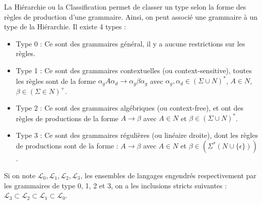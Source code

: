 La Hiérarchie ou la Classification permet de classer un type selon la forme des règles de production d'une grammaire. Ainsi, on peut associé une grammaire à un type de la Hiérarchie. Il existe 4 types :

\begin{itemize}
	\item Type 0 : Ce sont des grammaires général, il y a aucune restrictions sur les règles.
	\item Type 1 : Ce sont des grammaires contextuelles (ou context-sensitive), toutes les règles sont de la forme $\alpha_gA\alpha_d \rightarrow \alpha_g\beta\alpha_g$ avec $\alpha_g,\alpha_d \in (\Sigma \cup N)^*$, $A \in N$, $\beta \in (\Sigma \in N)^+$.
	\item Type 2 : Ce sont des grammaires algébriques (ou context-free), et ont des règles de productions de la forme $A \rightarrow \beta$ avec $A \in N$ et $\beta \in (\Sigma \cup N)^*$.
	\item Type 3 : Ce sont des grammaires régulières (ou linéaire droite), dont les règles de productions sont de la forme : $A \rightarrow \beta$ avec $A \in N$ et $\beta \in (\Sigma^*(N \cup \{\epsilon\}))$.
\end{itemize}

Si on note $\mathcal{L}_0, \mathcal{L}_1, \mathcal{L}_2, \mathcal{L}_3$, les ensembles de langages engendrés respectivement par les grammaires de type 0, 1, 2 et 3, on a les inclusions stricts suivantes : $\mathcal{L}_3 \subset \mathcal{L}_2 \subset \mathcal{L}_1 \subset \mathcal{L}_0$.

